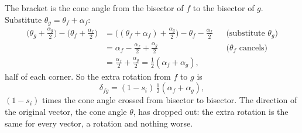 The bracket is the cone angle from the bisector of $f$ to the bisector of $g$. Substitute $\theta_g = \theta_f + \alpha_f$:
\begin{align*}
\Big(\theta_g + \frac{\alpha_g}2\Big) - \Big(\theta_f + \frac{\alpha_f}2\Big) &= \Big((\theta_f + \alpha_f) + \frac{\alpha_g}2\Big) - \theta_f - \frac{\alpha_f}2 && \text{(substitute $\theta_g$)} \\
&= \alpha_f - \frac{\alpha_f}{2} + \frac{\alpha_g}2 && \text{($\theta_f$ cancels)} \\
&= \frac{\alpha_f}{2} + \frac{\alpha_g}2 = \tfrac12(\alpha_f + \alpha_g) ,
\end{align*}
half of each corner. So the extra rotation from $f$ to $g$ is
\begin{equation*}
\delta_{fg} = (1 - s_i)\, \tfrac12 (\alpha_f + \alpha_g) ,
\end{equation*}
$(1 - s_i)$ times the cone angle crossed from bisector to bisector. The direction of the original vector, the cone angle $\theta$, has dropped out: the extra rotation is the same for every vector, a rotation and nothing worse.

